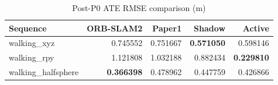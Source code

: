 \begin{table}[t]
\centering
\caption{Post-P0 ATE RMSE comparison (m)}
\begin{tabular}{lrrrr}
\toprule
Sequence & ORB-SLAM2 & Paper1 & Shadow & Active \\
\midrule
walking\_xyz & 0.745552 & 0.751667 & \textbf{0.571050} & 0.598146 \\
walking\_rpy & 1.121808 & 1.032188 & 0.882434 & \textbf{0.229810} \\
walking\_halfsphere & \textbf{0.366398} & 0.478962 & 0.447759 & 0.426866 \\
\bottomrule
\end{tabular}
\end{table}
